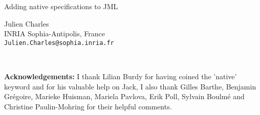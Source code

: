 \documentclass[a4paper, 10pt]{article}
\begin{document}
\begin{center}
\begin{bf}
{\LARGE Adding native specifications to JML}\\[1cm]
\end{bf}
{\large Julien Charles}\\
{\large INRIA Sophia-Antipolis, France}\\
{\tt Julien.Charles@sophia.inria.fr}\\[1cm]
\end{center}





\ \\
\begin{small}
\begin{it}
{\bf Acknowledgements:} I thank Lilian Burdy for having coined the 'native' keyword and 
for his valuable help on Jack, 
I also thank Gilles Barthe, Benjamin Gr\'egoire, Marieke Huisman, Mariela Pavlova, Erik Poll,
Sylvain Boulm\'e and Christine Paulin-Mohring for their helpful comments.
\end{it}
\end{small} 

\begin{small}


\end{small} 
\end{document}
